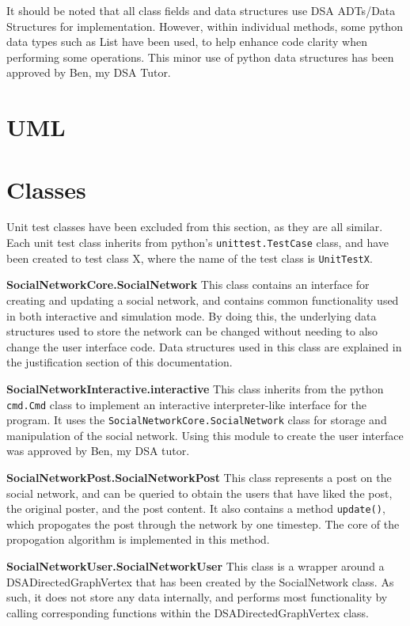 \documentclass{article}
\begin{document}
It should be noted that all class fields and data structures use DSA
ADTs/Data Structures for implementation. However, within individual methods,
some python data types such as List have been used, to help enhance code clarity
when performing some operations. This minor use of python data structures
has been approved by Ben, my DSA Tutor.

\section{UML}



\section{Classes}

Unit test classes have been excluded from this section,
as they are all similar. Each unit test class inherits from python's \texttt{unittest.TestCase} class,
and have been created to test class X, where the name of the test class is
\texttt{UnitTestX}.

\textbf{SocialNetworkCore.SocialNetwork}
This class contains an interface for creating and updating a social network,
and contains common functionality used in both interactive and simulation mode.
By doing this, the underlying data structures used to store the network
can be changed without needing to also change the user interface code.
Data structures used in this class are explained in the justification section
of this documentation.

\textbf{SocialNetworkInteractive.interactive}
This class inherits from the python \texttt{cmd.Cmd} class
to implement an interactive interpreter-like interface for the program.
It uses the \texttt{SocialNetworkCore.SocialNetwork} class for storage and manipulation of the social network.
Using this module to create the user interface was approved by Ben, my DSA tutor.

\textbf{SocialNetworkPost.SocialNetworkPost}
This class represents a post on the social network,
and can be queried to obtain the users that have liked the post, the original poster,
and the post content. It also contains a method \texttt{update()},
which propogates the post through the network by one timestep.
The core of the propogation algorithm is implemented in this method.

\textbf{SocialNetworkUser.SocialNetworkUser}
This class is a wrapper around a DSADirectedGraphVertex that has been created
by the SocialNetwork class. As such, it does not store any data internally,
and performs most functionality by calling corresponding functions within the DSADirectedGraphVertex class.
\end{document}
